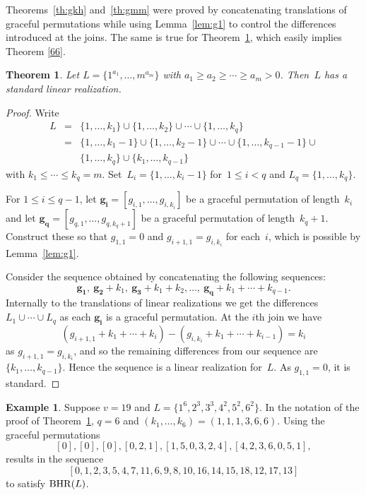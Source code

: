 \documentclass{amsart}
\newtheorem{thm}[prop]{Theorem}
\theoremstyle{definition}
\newtheorem{ex}[prop]{Example}
\numberwithin{equation}{section}
\def\BHR{\mathop{\rm BHR}}
\begin{document}
Theorems~\ref{th:gkh} and~\ref{th:gmm} were proved by concatenating translations of graceful permutations while
using Lemma~\ref{lem:g1} to control the differences introduced at the joins.  The same is true for Theorem~\ref{th:desc},
which easily implies Theorem \ref{66}.

\begin{thm}\label{th:desc}
Let $L = \{ 1^{a_1}, \ldots, m^{a_m} \}$ with $a_1 \geq a_2 \geq \cdots \geq a_m > 0$.  Then~$L$ has a standard linear realization.
\end{thm}

\begin{proof}
Write
\begin{eqnarray*}
L &=& \{ 1, \ldots, k_1\} \cup \{1, \ldots, k_2 \} \cup \cdots \cup \{ 1, \ldots, k_q \} \\
  & = & \{ 1, \ldots, k_1 -1 \} \cup \{1, \ldots, k_2 -1 \} \cup \cdots \cup \{ 1, \ldots, k_{q-1} -1 \} \cup\\
  &&\{ 1, \ldots, k_q \} \cup \{ k_1, \ldots, k_{q-1} \}
\end{eqnarray*}
with $k_1 \leq \cdots \leq k_q = m$.
Set~$L_i = \{ 1, \ldots, k_i -1 \}$ for~$1 \leq i < q$ and $L_q = \{ 1, \ldots, k_q \}$.

For $1 \leq i \leq q-1$, let $\bm{g_i} = [g_{i,1}, \ldots, g_{i,k_i }]$ be a graceful permutation of length~$k_i $
and let $\bm{g_q} = [g_{q,1}, \ldots, g_{q,k_q+1}] $ be a graceful permutation of length~$k_q+1$.  Construct these so that $g_{1,1} = 0$ and $g_{i+1,1} = g_{i,k_i}$ for each~$i$, which is possible by Lemma~\ref{lem:g1}.

Consider the sequence obtained by concatenating the following sequences:
$$ \bm{g_1}, \ \bm{ g_2} + k_1 , \  \bm{g_3} + k_1 + k_2 , \ldots, \ \bm{ g_{q}} +  k_1 + \cdots + k_{q-1}.$$
Internally to the translations of linear realizations we get the differences
$  L_1 \cup \cdots \cup L_q $ as each $\bm{g_i}$ is a graceful permutation.
At the $i$th join we have
$$(g_{i+1,1} + k_1 + \cdots + k_i) - (g_{i,k_i} + k_1 + \cdots + k_{i-1}) = k_i$$
as $g_{i+1,1} = g_{i,k_i}$, and so the remaining differences from our sequence are $\{ k_1, \ldots, k_{q-1} \}$.  Hence the sequence is a linear realization for~$L$.  As $g_{1,1} = 0$, it is standard.
\end{proof}


\begin{ex}\label{ex:v19}
Suppose $v=19$ and $L = \{ 1^6, 2^3, 3^3, 4^2, 5^2, 6^2 \}$.  In the notation of the proof of Theorem~\ref{th:desc}, $q=6$ and
$(k_1, \ldots, k_6) = (1,1,1,3,6,6)$.  Using the graceful permutations
$$[0], [0], [0], [0,2,1], [1,5,0,3,2,4], [4,2,3,6,0,5,1],$$
results in the sequence
$$[0,1,2,3,5,4,7,11,6,9,8,10,16,14,15,18,12,17,13]$$
to satisfy $\BHR(L)$.
\end{ex}
\end{document}
